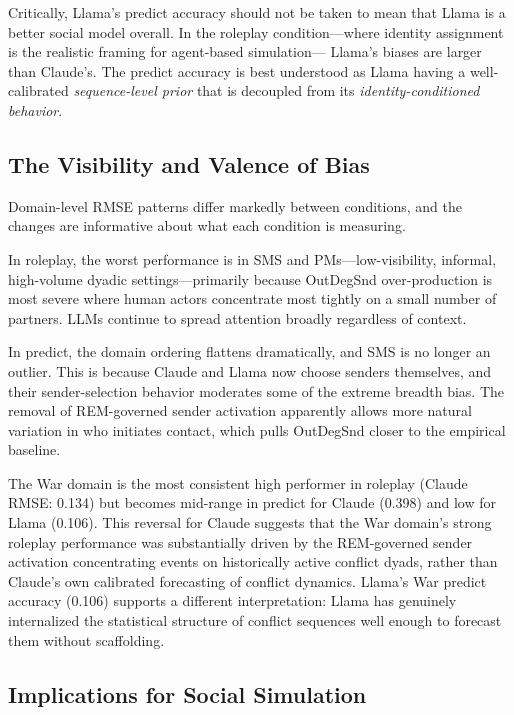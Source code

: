 \documentclass[11pt]{article}
\begin{document}
Critically, Llama's predict accuracy should not be taken to mean that Llama
is a better social model overall. In the roleplay condition---where
identity assignment is the realistic framing for agent-based simulation---
Llama's biases are larger than Claude's. The predict accuracy is best
understood as Llama having a well-calibrated \emph{sequence-level prior}
that is decoupled from its \emph{identity-conditioned behavior}.

\subsection{The Visibility and Valence of Bias}

Domain-level RMSE patterns differ markedly between conditions, and the
changes are informative about what each condition is measuring.

In roleplay, the worst performance is in SMS and PMs---low-visibility,
informal, high-volume dyadic settings---primarily because OutDegSnd
over-production is most severe where human actors concentrate most tightly
on a small number of partners. LLMs continue to spread attention broadly
regardless of context.

In predict, the domain ordering flattens dramatically, and SMS is
no longer an outlier. This is because Claude and Llama now choose senders
themselves, and their sender-selection behavior moderates some of the
extreme breadth bias. The removal of REM-governed sender activation
apparently allows more natural variation in who initiates contact, which
pulls OutDegSnd closer to the empirical baseline.

The War domain is the most consistent high performer in roleplay (Claude
RMSE: 0.134) but becomes mid-range in predict for Claude (0.398) and low
for Llama (0.106). This reversal for Claude suggests that the War domain's
strong roleplay performance was substantially driven by the REM-governed
sender activation concentrating events on historically active conflict
dyads, rather than Claude's own calibrated forecasting of conflict dynamics.
Llama's War predict accuracy (0.106) supports a different interpretation:
Llama has genuinely internalized the statistical structure of conflict
sequences well enough to forecast them without scaffolding.

\subsection{Implications for Social Simulation}
\end{document}

